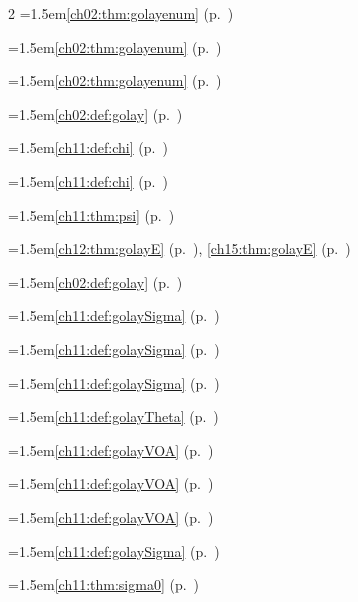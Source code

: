 \begin{multicols}{2}
\hangindent=1.5em\quad \ref{ch02:thm:golayenum} (p.~\pageref{ch02:thm:golayenum})\par
\hangindent=1.5em\quad \ref{ch02:thm:golayenum} (p.~\pageref{ch02:thm:golayenum})\par
\hangindent=1.5em\quad \ref{ch02:thm:golayenum} (p.~\pageref{ch02:thm:golayenum})\par
\hangindent=1.5em\quad \ref{ch02:def:golay} (p.~\pageref{ch02:def:golay})\par
\hangindent=1.5em\quad \ref{ch11:def:chi} (p.~\pageref{ch11:def:chi})\par
\hangindent=1.5em\quad \ref{ch11:def:chi} (p.~\pageref{ch11:def:chi})\par
\hangindent=1.5em\quad \ref{ch11:thm:psi} (p.~\pageref{ch11:thm:psi})\par
\hangindent=1.5em\quad \ref{ch12:thm:golayE} (p.~\pageref{ch12:thm:golayE}), \ref{ch15:thm:golayE} (p.~\pageref{ch15:thm:golayE})\par
\hangindent=1.5em\quad \ref{ch02:def:golay} (p.~\pageref{ch02:def:golay})\par
\hangindent=1.5em\quad \ref{ch11:def:golaySigma} (p.~\pageref{ch11:def:golaySigma})\par
\hangindent=1.5em\quad \ref{ch11:def:golaySigma} (p.~\pageref{ch11:def:golaySigma})\par
\hangindent=1.5em\quad \ref{ch11:def:golaySigma} (p.~\pageref{ch11:def:golaySigma})\par
\hangindent=1.5em\quad \ref{ch11:def:golayTheta} (p.~\pageref{ch11:def:golayTheta})\par
\hangindent=1.5em\quad \ref{ch11:def:golayVOA} (p.~\pageref{ch11:def:golayVOA})\par
\hangindent=1.5em\quad \ref{ch11:def:golayVOA} (p.~\pageref{ch11:def:golayVOA})\par
\hangindent=1.5em\quad \ref{ch11:def:golayVOA} (p.~\pageref{ch11:def:golayVOA})\par
\hangindent=1.5em\quad \ref{ch11:def:golaySigma} (p.~\pageref{ch11:def:golaySigma})\par
\hangindent=1.5em\quad \ref{ch11:thm:sigma0} (p.~\pageref{ch11:thm:sigma0})\par

\end{multicols}
